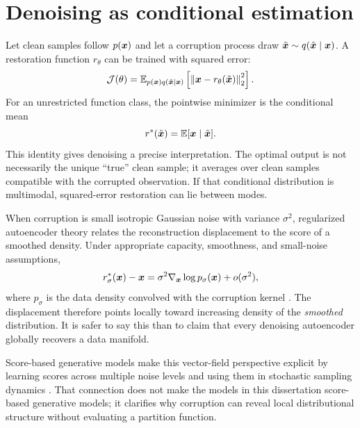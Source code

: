 \section{Denoising as conditional estimation}
\label{sec:framework-denoising}

Let clean samples follow $p(\bm{x})$ and let a corruption process draw $\tilde{\bm{x}}\sim q(\tilde{\bm{x}}\mid\bm{x})$. A restoration function $r_\theta$ can be trained with squared error:
\begin{equation}
\label{eq:denoising-objective}
\mathcal{J}(\theta)
=\mathbb{E}_{p(\bm{x})q(\tilde{\bm{x}}\mid\bm{x})}
\left[\left\lVert \bm{x}-r_\theta(\tilde{\bm{x}})\right\rVert_2^2\right].
\end{equation}
For an unrestricted function class, the pointwise minimizer is the conditional mean
\begin{equation}
\label{eq:conditional-mean}
r^*(\tilde{\bm{x}})=\mathbb{E}[\bm{x}\mid\tilde{\bm{x}}].
\end{equation}
This identity gives denoising a precise interpretation. The optimal output is not necessarily the unique ``true'' clean sample; it averages over clean samples compatible with the corrupted observation. If that conditional distribution is multimodal, squared-error restoration can lie between modes.

When corruption is small isotropic Gaussian noise with variance $\sigma^2$, regularized autoencoder theory relates the reconstruction displacement to the score of a smoothed density. Under appropriate capacity, smoothness, and small-noise assumptions,
\begin{equation}
\label{eq:score-reconstruction}
r^*_{\sigma}(\bm{x})-\bm{x}
=\sigma^2\nabla_{\bm{x}}\log p_{\sigma}(\bm{x})+o(\sigma^2),
\end{equation}
where $p_\sigma$ is the data density convolved with the corruption kernel \citep{alain14}. The displacement therefore points locally toward increasing density of the \emph{smoothed} distribution. It is safer to say this than to claim that every denoising autoencoder globally recovers a data manifold.

Score-based generative models make this vector-field perspective explicit by learning scores across multiple noise levels and using them in stochastic sampling dynamics \citep{song19}. That connection does not make the models in this dissertation score-based generative models; it clarifies why corruption can reveal local distributional structure without evaluating a partition function.

